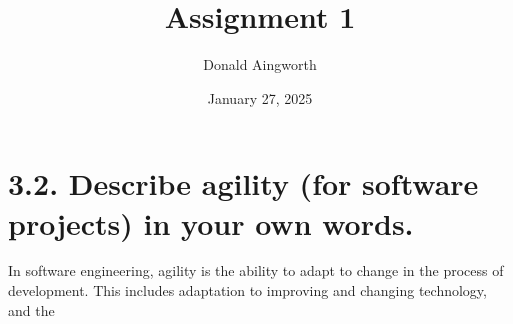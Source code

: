 \documentclass[12pt]{article}
\title{Assignment 1}
\author{Donald Aingworth}
\date{January 27, 2025}
\begin{document}
\maketitle

\pagebreak
\section*{3.2. Describe agility (for software projects) in your own words.}
In software engineering, agility is the ability to adapt to change in the process of development. This includes adaptation to improving and changing technology, and the 
\end{document}
